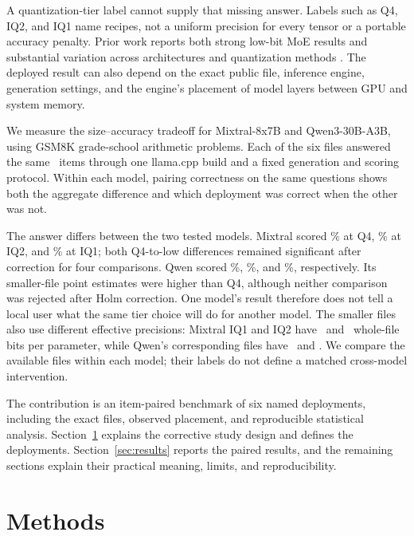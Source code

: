 \documentclass[11pt]{article}
\begin{document}
A quantization-tier label cannot supply that missing answer. Labels such as
Q4, IQ2, and IQ1 name recipes, not a uniform precision for every tensor or a
portable accuracy penalty. Prior work reports both strong low-bit MoE results
and substantial variation across architectures and quantization methods
\citep{kim2023moqe,frantar2023qmoe,moefragile2024,
li2024quantmoebench}. The deployed result can also depend on the exact public
file, inference engine, generation settings, and the engine's placement of
model layers between GPU and system memory.

We measure the size--accuracy tradeoff for Mixtral-8x7B and Qwen3-30B-A3B,
using GSM8K grade-school arithmetic problems. Each of the six files answered the same
\PfourPrimaryItemCount\ items through one llama.cpp build and a fixed
generation and scoring protocol. Within each model, pairing correctness on the
same questions shows both the aggregate difference and which deployment was
correct when the other was not.

The answer differs between the two tested models. Mixtral scored
\PfourMixtralHealthyAccuracyPct\% at Q4,
\PfourMixtralIqTwoAccuracyPct\% at IQ2, and
\PfourMixtralIqOneAccuracyPct\% at IQ1; both Q4-to-low differences remained
significant after correction for four comparisons. Qwen scored
\PfourQwenMoeHealthyAccuracyPct\%, \PfourQwenMoeIqTwoAccuracyPct\%, and
\PfourQwenMoeIqOneAccuracyPct\%, respectively. Its smaller-file point
estimates were higher than Q4, although neither comparison was rejected after
Holm correction. One model's result therefore does not tell a local user what
the same tier choice will do for another model.
The smaller files also use different effective precisions: Mixtral IQ1 and
IQ2 have \PfourMixtralIqOneEffectiveBpw\ and
\PfourMixtralIqTwoEffectiveBpw\ whole-file bits per parameter, while Qwen's
corresponding files have \PfourQwenMoeIqOneEffectiveBpw\ and
\PfourQwenMoeIqTwoEffectiveBpw. We compare the available files within each
model; their labels do not define a matched cross-model intervention.

The contribution is an item-paired benchmark of six named deployments,
including the exact files, observed placement, and reproducible statistical
analysis. Section~\ref{sec:methods} explains the corrective study design and
defines the deployments. Section~\ref{sec:results} reports the paired results, and the
remaining sections explain their practical meaning, limits, and
reproducibility.

\section{Methods}
\label{sec:methods}
\end{document}
